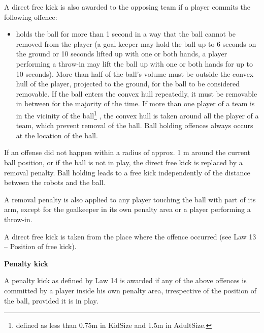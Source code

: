 \bigskip


A direct free kick is also awarded to the opposing team if a player commits
the following offence:

\begin{itemize}
  \item {}holds the ball for more than 1 second in a way that the
  ball cannot be removed from the player (a goal keeper may hold the ball up to
  6 seconds on the ground or 10 seconds lifted up with one or both hands,
    a player performing a throw-in may lift the ball up with one or both hands
    for up to 10 seconds). More than half of the ball's volume must be outside
  the convex hull of the player, projected to the ground, for the ball to be
  considered removable. If the ball enters the convex hull repeatedly, it must
  be removable in between for the majority of the time. If more than one player
  of a team is in the vicinity of the ball\footnote{
    defined as less than 0.75m in KidSize and 1.5m in AdultSize.}
  , the convex hull is taken around all
  the player of a team, which prevent removal of the ball.
  Ball holding offences always occurs at the location of the ball.
\end{itemize}

\bigskip

If an offense did not happen within a radius of approx. 1 m
around the current ball position, or if the ball is not in play,
the direct free kick is replaced by a removal penalty.
Ball holding leads to a free kick independently of the distance between
the robots and the ball.

\bigskip

A removal penalty is also applied to any player touching the ball with
part of its arm, except for the goalkeeper in its own penalty area or a player
performing a throw-in.


\bigskip


A direct free kick is taken from the place where the offence occurred (see Law 13 -- Position of free kick).


\bigskip

{\bfseries Penalty kick}

\headlinebox

A penalty kick as defined by Law 14 is awarded if any of the above
offences is committed by a player inside his own penalty area,
irrespective of the position of the ball, provided it is in play.


